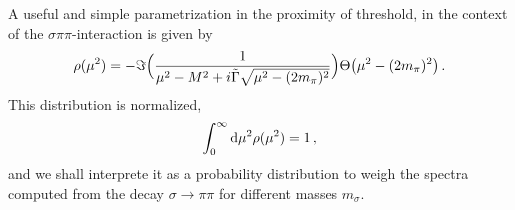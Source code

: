 A useful and simple parametrization in the proximity of threshold, in the context of the $\sigma\pi\pi$-interaction is given by \cite{GiacosaEtAl_2021}
\begin{equation}
    \rho(\mu^2)=-\Im\Big(\frac{1}{\mu^2-M^2+{i}\tilde{\Gamma}\sqrt{\mu^2-(2m_\pi)^2}}\Big)\Theta\big(\mu^2-(2m_\pi)^2\big)\,.
\end{equation}
This distribution is normalized,
\begin{equation}
    \int_0^\infty\text{d}\mu^2\rho(\mu^2)=1\,,
\end{equation}
and we shall interprete it as a probability distribution to weigh the spectra computed from the decay ${\sigma\to\pi\pi}$ for different masses $m_\sigma$.